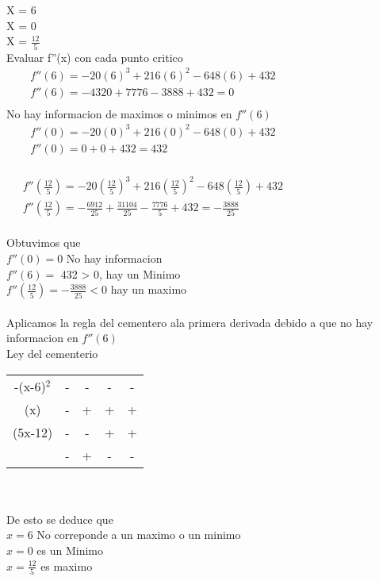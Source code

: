 \documentclass{report}
\begin{document}
{     \vspace{6cm}
     X = 6\\
     X = 0\\
     X = $\frac{12}{5} $\\

     Evaluar f''(x) con cada punto critico
     \begin{align*}
          &f''(6) = -20(6)^3 + 216(6)^2-648(6)+432 &&&&&&&&&&&&&\\
          & f''(6) =  -4320 + 7776 -3888 + 432 = 0\\
     \end{align*}
     No hay informacion de maximos o minimos en $f''(6)$
     \begin{align*}
          &f''(0) = -20(0)^3 + 216(0)^2-648(0)+432 &&&&&&&&&&&&&\\
          & f''(0) =  0  + 0 + 432 = 432\\
     \end{align*}

     \begin{align*}
          &f'' \left(\frac{12}{5}  \right)= -20\left(\frac{12}{5}  \right)^3 + 216\left(\frac{12}{5}  \right)^2-648\left(\frac{12}{5}  \right)+432 &&&&&&&&&&&&&\\
          &f'' \left(\frac{12}{5}  \right)=  -\frac{6912}{25}  + \frac{31104}{25} - \frac{7776}{5}+ 432 = -\frac{3888}{25} \\
     \end{align*}
     
     Obtuvimos que \\
     $f''(0) = 0 $ No hay informacion \\
     $f''(6) = $ 432 > 0, hay un Minimo\\
     $f''\left(\frac{12}{5}\right) = - \frac{3888}{25} < 0$ hay un maximo
\\\\
     Aplicamos la regla del cementero  ala primera derivada debido a que no hay informacion
     en $f''(6)$\\
     Ley del cementerio\\

     \begin{tabular}{c c c c c}
          -(x-6)$^{2}$ & - & - & - & -\\ 
          (x)  & - & + & + & +\\
           (5x-12)& - & - &  + &+ \\
           & - & + & - & -\\
     \end{tabular}\\\\
     De esto se deduce que \\
     $x =6 $ No correponde a un maximo o un minimo \\
     $x = 0 $ es un Minimo\\
     $x = \frac{12}{5} $ es maximo

}
\end{document}
